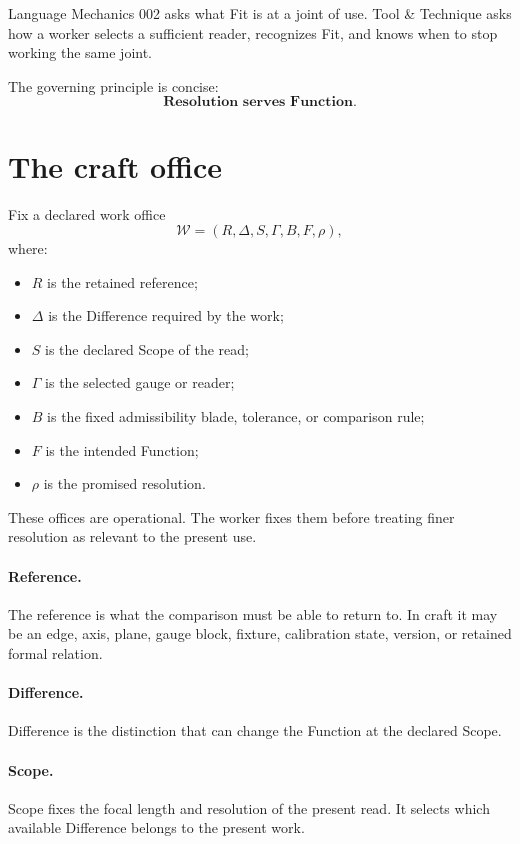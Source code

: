 \documentclass[10pt]{article}
\begin{document}
Language Mechanics 002 asks what Fit is at a joint of use. Tool \& Technique asks how a worker selects a sufficient reader, recognizes Fit, and knows when to stop working the same joint.

The governing principle is concise:
\[
\boxed{\textbf{Resolution serves Function.}}
\]

\section{The craft office}

Fix a declared work office
\[
\mathcal W=(R,\Delta,S,\Gamma,B,F,\rho),
\]
where:
\begin{itemize}
\item $R$ is the retained reference;
\item $\Delta$ is the Difference required by the work;
\item $S$ is the declared Scope of the read;
\item $\Gamma$ is the selected gauge or reader;
\item $B$ is the fixed admissibility blade, tolerance, or comparison rule;
\item $F$ is the intended Function;
\item $\rho$ is the promised resolution.
\end{itemize}

These offices are operational. The worker fixes them before treating finer resolution as relevant to the present use.

\paragraph{Reference.} The reference is what the comparison must be able to return to. In craft it may be an edge, axis, plane, gauge block, fixture, calibration state, version, or retained formal relation.

\paragraph{Difference.} Difference is the distinction that can change the Function at the declared Scope.

\paragraph{Scope.} Scope fixes the focal length and resolution of the present read. It selects which available Difference belongs to the present work.
\end{document}
